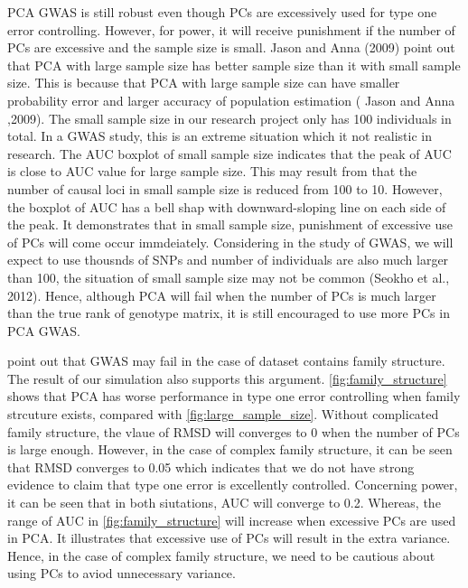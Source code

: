 \documentclass[11pt]{article}
\begin{document}
PCA GWAS is still robust even though PCs are excessively used for type one error controlling. However, for power, it will receive punishment if the number of PCs are excessive and the sample size is small.
Jason and Anna (2009) point out that PCA with large sample size has better sample size than it with small sample size.
This is because that PCA with large sample size can have smaller probability error and larger accuracy of population estimation ( Jason and Anna ,2009).
The small sample size in our research project only has 100 individuals in total.
In a GWAS study, this is an extreme situation which it not realistic in research.
The AUC boxplot of small sample size indicates that the peak of AUC is close to AUC value for large sample size.
This may result from that the number of causal loci in small sample size is reduced from 100 to 10.
However, the boxplot of AUC has a bell shap with downward-sloping line on each side of the peak.
It demonstrates that in small sample size, punishment of excessive use of PCs will come occur immdeiately.
Considering in the study of GWAS, we will expect to use thousnds of SNPs and number of individuals are also much larger than 100, the situation of small sample size may not be common (Seokho et al., 2012).
Hence, although PCA will fail when the number of PCs is much larger than the true rank of genotype matrix, it is still encouraged to use more PCs in PCA GWAS.


\citep{price_new_2010} point out that GWAS may fail in the case of dataset contains  family structure.
The result of our simulation also supports this argument.
\cref{fig:family_structure} shows that PCA has worse performance in type one error controlling when family strcuture exists, compared with \cref{fig:large_sample_size}.
Without complicated family structure, the vlaue of RMSD will converges to 0 when the number of PCs is large enough.
However, in the case of complex family structure, it can be seen that RMSD converges to 0.05 which indicates that we do not have strong evidence to claim that type one error is excellently controlled.
Concerning power, it can be seen that in both siutations, AUC will converge to 0.2.
Whereas, the range of AUC in \cref{fig:family_structure} will increase when excessive PCs are used in PCA.
It illustrates that excessive use of PCs will result in the extra variance. 
Hence, in the case of complex family structure, we need to be cautious about using PCs to aviod unnecessary variance. 
\end{document}
